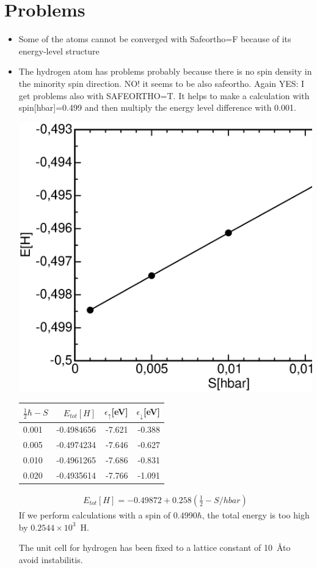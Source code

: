 \documentclass{book}
\begin{document}
\section*{Problems}
\begin{itemize}
\item Some of the atoms cannot be converged with Safeortho=F because of 
its energy-level structure
\item The hydrogen atom has problems probably because there is no spin
density in the minority spin direction. NO! it seems to be also
safeortho. Again YES: I get problems also with SAFEORTHO=T. It helps
to make a calculation with spin[hbar]=0.499 and then multiply the
energy level difference with 0.001. 
\begin{center}
\includegraphics[width=0.5\linewidth,clip=t]{Figs/hydrogenetot.eps}
\begin{tabular}{|l|r|r|r|}
\hline
$\frac{1}{2}\hbar-S$ & $E_{tot}[H]$ & $\epsilon_\uparrow$[eV]& $\epsilon_\downarrow$[eV] \\
\hline
0.001 &  -0.4984656 &  -7.621&   -0.388 \\
0.005 &  -0.4974234 &  -7.646&   -0.627\\ 
0.010 &  -0.4961265 &  -7.686&   -0.831 \\
0.020 &  -0.4935614 &  -7.766&   -1.091 \\
\hline
\end{tabular}
\end{center}
\begin{eqnarray*}
E_{tot}[H]=-0.49872+0.258(\frac{1}{2}-S/hbar)
\end{eqnarray*}
If we perform calculations with a spin of $0.4990 \hbar$, the total
energy is too high by $0.2544\times 10^3$~H.

The unit cell for hydrogen has been fixed to a lattice constant of
10~\AA to avoid instabilitis.


\end{itemize}
\end{document}
